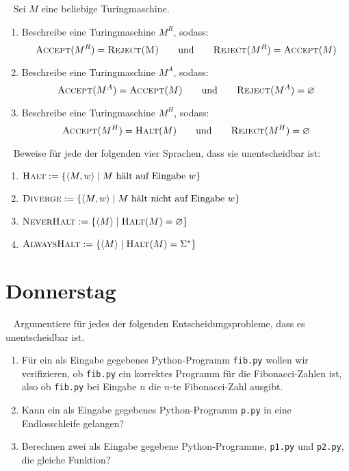 \documentclass{uebung_cs}
\begin{document}
\begin{exercise}[Turingmaschinen]\
	Sei $M$ eine beliebige Turingmaschine.
	\begin{enumerate}
		\item Beschreibe eine Turingmaschine $M^R$, sodass:
		$$\textsc{Accept}(M^R) = \textsc{Reject(M)} \qquad \text{und} \qquad \textsc{Reject}(M^R) = \textsc{Accept}(M)$$
		
		\item Beschreibe eine Turingmaschine $M^A$, sodass:
		$$\textsc{Accept}(M^A) = \textsc{Accept}(M) \qquad \text{und} \qquad \textsc{Reject}(M^A) = \varnothing$$
		
		\item Beschreibe eine Turingmaschine $M^H$, sodass:
		$$\textsc{Accept}(M^H) = \textsc{Halt}(M) \qquad \text{und} \qquad \textsc{Reject}(M^H) = \varnothing$$
	\end{enumerate}
\end{exercise}

\begin{exercise}[Entscheidbarkeit I]\
	Beweise für jede der folgenden vier Sprachen, dass sie unentscheidbar ist:
	\begin{enumerate}
		\item $\textsc{Halt} := \{\langle M,w\rangle \;|\; M \text{ hält auf Eingabe } w\}$
		\item $\textsc{Diverge} := \{\langle M,w\rangle \;|\; M \text{ hält nicht auf Eingabe } w\}$
		\item $\textsc{NeverHalt} := \{\langle M \rangle \;|\; \textsc{Halt}(M) = \varnothing\}$
		\item $\textsc{AlwaysHalt} := \{\langle M \rangle \;|\; \textsc{Halt}(M) = \Sigma^{\ast}\}$
	\end{enumerate}
\end{exercise}

\section*{Donnerstag}

\begin{exercise}[Entscheidbarkeit II]\
	Argumentiere für jedes der folgenden Entscheidungsprobleme, dass es unentscheidbar ist.
	\begin{enumerate}
		\item Für ein als Eingabe gegebenes Python-Programm \texttt{fib.py} wollen wir verifizieren, ob \texttt{fib.py} ein korrektes Programm für die Fibonacci-Zahlen ist, also ob \texttt{fib.py} bei Eingabe $n$ die $n$-te Fibonacci-Zahl ausgibt.
		\item Kann ein als Eingabe gegebenes Python-Programm \texttt{p.py} in eine Endlosschleife gelangen?
		\item Berechnen zwei als Eingabe gegebene Python-Programme, \texttt{p1.py} und \texttt{p2.py}, die gleiche Funktion?
	\end{enumerate}
\end{exercise}
\end{document}
